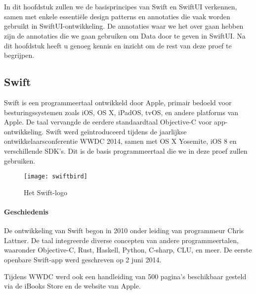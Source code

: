 \chapter{}%
\label{ch:stand-van-zaken}


In dit hoofdstuk zullen we de basisprincipes van Swift en SwiftUI verkennen, samen met enkele essentiële design patterns en annotaties die vaak worden gebruikt in SwiftUI-ontwikkeling. De annotaties waar we het over gaan hebben zijn de annotaties die we gaan gebruiken om Data door te geven in SwiftUI. Na dit hoofdstuk heeft u genoeg kennis en inzicht om de rest van deze proef te begrijpen.


\section{Swift}
Swift is een programmeertaal ontwikkeld door Apple, primair bedoeld voor besturingssystemen zoals iOS, OS X, iPadOS, tvOS, en andere platforms van Apple. De taal vervangde de eerdere standaardtaal Objective-C voor app-ontwikkeling. Swift werd geïntroduceerd tijdens de jaarlijkse ontwikkelaarsconferentie WWDC 2014, samen met OS X Yosemite, iOS 8 en verschillende SDK's. Dit is de basis programmeertaal die we in deze proef zullen gebruiken.
\begin{figure}[H]
    \centering
    \texttt{[image: swiftbird]}
    \caption{Het Swift-logo \autocite{SwiftBirdImage}}
    \label{fig:swift}
\end{figure}

\subsubsection{Geschiedenis}
De ontwikkeling van Swift begon in 2010 onder leiding van programmeur Chris Lattner. De taal integreerde diverse concepten van andere programmeertalen, waaronder Objective-C, Rust, Haskell, Python, C-sharp, CLU, en meer. De eerste openbare Swift-app werd geschreven op 2 juni 2014.

Tijdens WWDC werd ook een handleiding van 500 pagina's beschikbaar gesteld via de iBooks Store en de website van Apple.
